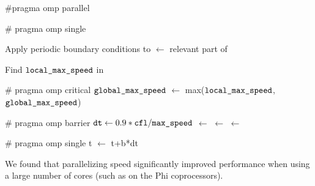 \begin{algorithm}[hh]
\begin{algorithmic}[1]
\item \#pragma omp parallel
    \item \# pragma omp single
    \item Apply periodic boundary conditions to 
    \State {} $\gets$ relevant part of 
    \item Find $\texttt{local\_max\_speed}$ in 
    \item \# pragma omp critical
    \State $\texttt{global\_max\_speed}$ $\gets$ max($\texttt{local\_max\_speed}$,$\texttt{global\_max\_speed}$)
    \item \# pragma omp barrier
    \State $\texttt{dt} \gets 0.9*\texttt{cfl} / \texttt{max\_speed}$
    	\State {} $\gets$  
    	\State {} $\gets$ 
    \EndFor
    \State {} $\gets$ 
    \item \# pragma omp single
    \State t $\gets$ t+b*dt
\EndWhile
\end{algorithmic}
\end{algorithm}

We found that parallelizing speed significantly improved performance when using a large number of cores (such as on the Phi coprocessors).

\newpage


	
